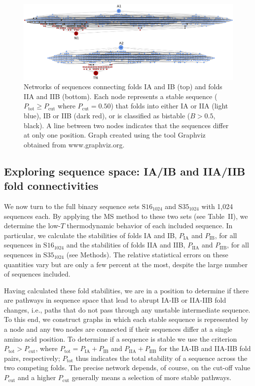 \documentclass[
aip,
rsi,%
amsmath,amssymb,
reprint,%
]{revtex4-1}
\newcommand {\Pcut}     	{{P_\mathrm{cut}}}
\newcommand {\Ptot}	{{P_\mathrm{tot}}}
\newcommand {\PIA}    	{{P_\mathrm{IA}}}
\newcommand {\PIB}    	{{P_\mathrm{IB}}}
\newcommand {\PIIA}    	{{P_\mathrm{IIA}}}
\newcommand {\PIIB}    	{{P_\mathrm{IIB}}}
\newcommand {\SI}		{${\mathrm{S16}_{1024}}$}
\newcommand {\SII}		{${\mathrm{S35}_{1024}}$}
\begin{document}
\begin{figure}
\includegraphics[width=17.0cm]{Fig5}
\caption{Networks of sequences connecting folds IA and IB (top) and folds IIA and IIB (bottom). Each node represents a stable sequence ($\Ptot\ge\Pcut$ where $\Pcut=0.50$) that folds into either IA or IIA (light blue), IB or IIB (dark red), or is classified as bistable ($B>0.5$, black). A line between two nodes indicates that the sequences differ at only one position. Graph created using the tool Graphviz~\protect\cite{Graphviz2000} obtained from www.graphviz.org.}
\end{figure}

\vspace{12pt}
\subsection{Exploring sequence space: IA/IB and IIA/IIB fold connectivities}

We now turn to the full binary sequence sets {\SI} and {\SII} with 1,024 sequences each. By applying the MS method to these two sets (see Table~II), we determine the low-$T$ thermodynamic behavior of each included sequence. In particular, we calculate the stabilities of folds IA and IB, $\PIA$ and $\PIB$, for all sequences in {\SI} and the stabilities of folds IIA and IIB, $\PIIA$ and $\PIIB$, for all sequences in {\SII} (see Methods). The relative statistical errors on these quantities vary but are only a few percent at the most, despite the large number of sequences included.  

Having calculated these fold stabilities, we are in a position to determine if there are pathways in sequence space that lead to abrupt IA-IB or IIA-IIB fold changes, i.e., paths that do not pass through any unstable intermediate sequence. To this end, we construct graphs in which each stable sequence is represented by a node and any two nodes are connected if their sequences differ at a single amino acid position. To determine if a sequence is stable we use the criterion $P_\mathrm{tot}>\Pcut$, where  $\Ptot = \PIA + \PIB$ and $\PIIA + \PIIB$ for the IA-IB and IIA-IIB fold pairs, respectively; $\Ptot$ thus indicates the total stability of a sequence across the two competing folds. The precise network depends, of course, on the cut-off value $\Pcut$ and a higher $\Pcut$ generally means a selection of more stable pathways. 
\end{document}
